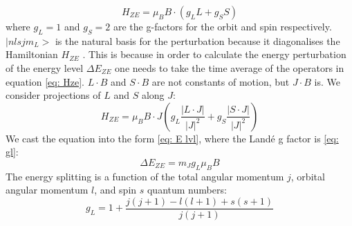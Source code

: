 \documentclass[11pt]{article}
\begin{document}
\begin{equation}
    H_{ZE} = \mu_B B \cdot (g_L L + g_S S) \label{eq: Hze}
\end{equation}
where $g_L = 1$ and $g_S = 2$ are the g-factors for the orbit and spin respectively. $|n l s j m_L >$ is the natural basis for the perturbation because it diagonalises the Hamiltonian $H_{ZE}$ \cite{foot2005atomic}. This is because in order to calculate the energy perturbation of the energy level $\Delta E_{ZE}$ one needs to take the time average of the operators in equation \eqref{eq: Hze}. $L \cdot B$ and $S \cdot B$ are not constants of motion, but $J \cdot B$ is. We consider projections of $L$ and $S$ along $J$: 
\begin{equation}
    H_{ZE} = \mu_B B \cdot J(g_L \frac{|L \cdot J|}{|J|^2} + 
    g_S \frac{|S \cdot J|}{|J|^2}) \label{eq: Hze J}
\end{equation}
We cast the equation into the form \eqref{eq: E lvl}, where the Landé g factor is \eqref{eq: gl}: 
\begin{equation}
    \Delta E_{ZE} = m_J g_L \mu_B B \label{eq: E lvl}
\end{equation}
The energy splitting is a function of the total angular momentum $j$, orbital angular momentum $l$, and spin $s$ quantum numbers: 
\begin{equation}
    g_L = 1 + \frac{j(j+1)-l(l+1) +s(s+1)}{j(j+1)} \label{eq: gl}
\end{equation}
\end{document}
